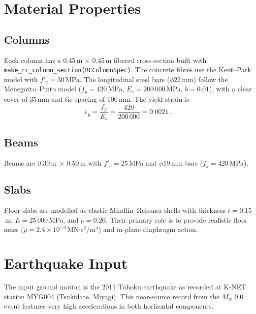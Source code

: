 \section{Material Properties}
\label{sec:lshaped-materials}

\subsection{Columns}
\label{sec:lshaped-col-mat}

Each column has a 0.45\,m $\times$ 0.45\,m fibered cross-section
built with \texttt{make\_rc\_column\_section(RCColumnSpec)}.
The concrete fibres use the Kent--Park model with $f'_c = 30$\,MPa.
The longitudinal steel bars ($\phi 22$\,mm) follow the
Menegotto--Pinto model ($f_y = 420$\,MPa, $E_s = 200\,000$\,MPa,
$b = 0.01$), with a clear cover of 35\,mm and tie spacing of 100\,mm.
The yield strain is
\begin{equation}
  \varepsilon_y = \frac{f_y}{E_s} = \frac{420}{200\,000} = 0.0021 \,.
  \label{eq:eps-yield}
\end{equation}

\subsection{Beams}
\label{sec:lshaped-beam-mat}

Beams are 0.30\,m $\times$ 0.50\,m with $f'_c = 25$\,MPa and
$\phi 19$\,mm bars ($f_y = 420$\,MPa).

\subsection{Slabs}
\label{sec:lshaped-slab-mat}

Floor slabs are modelled as elastic Mindlin--Reissner shells with
thickness $t = 0.15$\,m, $E = 25\,000$\,MPa, and $\nu = 0.20$.
Their primary role is to provide realistic floor mass
($\rho = 2.4 \times 10^{-3}$\,MN$\cdot$s$^2$/m$^4$)
and in-plane diaphragm action.


\section{Earthquake Input}
\label{sec:lshaped-earthquake}

The input ground motion is the 2011 T\={o}hoku earthquake as recorded at
K-NET station MYG004 (Tsukidate, Miyagi).  This near-source record
from the $M_w$ 9.0 event features very high accelerations in both
horizontal components.


